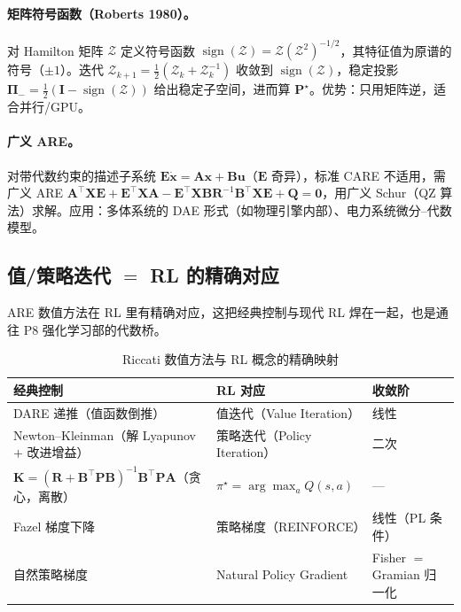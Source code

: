 \paragraph{矩阵符号函数（Roberts 1980）。}对 Hamilton 矩阵 $\mathcal Z$ 定义符号函数 $\operatorname{sign}(\mathcal Z)=\mathcal Z(\mathcal Z^2)^{-1/2}$，其特征值为原谱的符号（$\pm1$）。迭代 $\mathcal Z_{k+1}=\tfrac12(\mathcal Z_k+\mathcal Z_k^{-1})$ 收敛到 $\operatorname{sign}(\mathcal Z)$，稳定投影 $\boldsymbol\Pi_-=\tfrac12(\mathbf I-\operatorname{sign}(\mathcal Z))$ 给出稳定子空间，进而算 $\mathbf P^\star$\cite{roberts1980linear}。优势：只用矩阵逆，适合并行/GPU。

\paragraph{广义 ARE。}对带代数约束的描述子系统 $\mathbf E\dot{\mathbf x}=\mathbf A\mathbf x+\mathbf B\mathbf u$（$\mathbf E$ 奇异），标准 CARE 不适用，需广义 ARE $\mathbf A^\top\mathbf X\mathbf E+\mathbf E^\top\mathbf X\mathbf A-\mathbf E^\top\mathbf X\mathbf B\mathbf R^{-1}\mathbf B^\top\mathbf X\mathbf E+\mathbf Q=\mathbf0$，用广义 Schur（QZ 算法）求解。应用：多体系统的 DAE 形式（如物理引擎内部）、电力系统微分--代数模型。

\subsection{值/策略迭代 \texorpdfstring{$=$}{=} RL 的精确对应}
\label{sec:lqr-rl-bridge}

ARE 数值方法在 RL 里有精确对应，这把经典控制与现代 RL 焊在一起，也是通往 P8 强化学习部的代数桥。

\begin{table}[H]\centering\small
\caption{Riccati 数值方法与 RL 概念的精确映射}
\label{tab:lqr-rl-map}
\begin{tabular}{lll}
\toprule
经典控制 & RL 对应 & 收敛阶 \\
\midrule
DARE 递推（值函数倒推） & 值迭代（Value Iteration） & 线性 \\
Newton--Kleinman（解 Lyapunov $+$ 改进增益） & 策略迭代（Policy Iteration） & 二次 \\
$\mathbf K=(\mathbf R+\mathbf B^\top\mathbf P\mathbf B)^{-1}\mathbf B^\top\mathbf P\mathbf A$（贪心，离散） & $\pi^\star=\arg\max_a Q(s,a)$ & --- \\
Fazel 梯度下降\cite{fazel2018global} & 策略梯度（REINFORCE） & 线性（PL 条件） \\
自然策略梯度 & Natural Policy Gradient & Fisher $=$ Gramian 归一化 \\
\bottomrule
\end{tabular}
\end{table}

